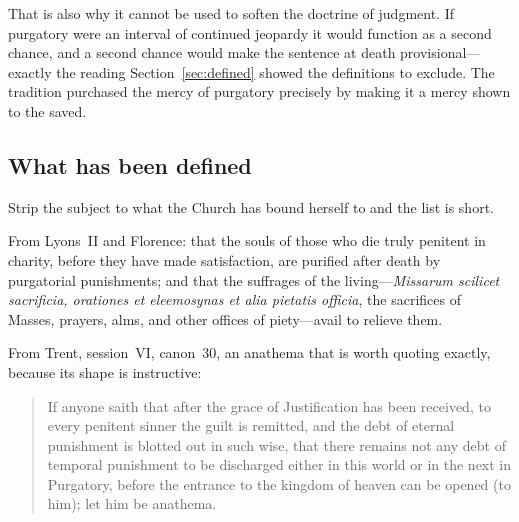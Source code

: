 That is also why it cannot be used to soften the doctrine of judgment. If purgatory were an interval of continued jeopardy it would function as a second chance, and a second chance would make the sentence at death provisional---exactly the reading Section~\ref{sec:defined} showed the definitions to exclude. The tradition purchased the mercy of purgatory precisely by making it a mercy shown to the saved.

\subsection{What has been defined}

Strip the subject to what the Church has bound herself to and the list is short.

From Lyons~II and Florence: that the souls of those who die truly penitent in charity, before they have made satisfaction, are purified after death by purgatorial punishments; and that the suffrages of the living---\emph{Missarum scilicet sacrificia, orationes et eleemosynas et alia pietatis officia}, the sacrifices of Masses, prayers, alms, and other offices of piety---avail to relieve them.

From Trent, session~VI, canon~30, an anathema that is worth quoting exactly, because its shape is instructive:

\begin{quote}
If anyone saith that after the grace of Justification has been received, to every penitent sinner the guilt is remitted, and the debt of eternal punishment is blotted out in such wise, that there remains not any debt of temporal punishment to be discharged either in this world or in the next in Purgatory, before the entrance to the kingdom of heaven can be opened (to him); let him be anathema.
\end{quote}

